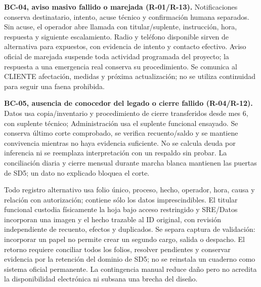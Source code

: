\textbf{BC-04, aviso masivo fallido o marejada (R-01/R-13).} Notificaciones conserva destinatario, intento, acuse técnico y confirmación humana separados. Sin acuse, el operador abre llamada con titular/suplente, instrucción, hora, respuesta y siguiente escalamiento. Radio y teléfono disponible sirven de alternativa para expuestos, con evidencia de intento y contacto efectivo. Aviso oficial de marejada suspende toda actividad programada del proyecto; la respuesta a una emergencia real conserva su procedimiento. Se comunica al CLIENTE afectación, medidas y próxima actualización; no se utiliza continuidad para seguir una faena prohibida.

\textbf{BC-05, ausencia de conocedor del legado o cierre fallido (R-04/R-12).} Datos usa copia/inventario y procedimiento de cierre transferidos desde mes 6, con suplente técnico; Administración usa el suplente funcional ensayado. Se conserva último corte comprobado, se verifica recuento/saldo y se mantiene convivencia mientras no haya evidencia suficiente. No se calcula deuda por inferencia ni se reemplaza interpretación con un respaldo sin probar. La conciliación diaria y cierre mensual durante marcha blanca mantienen las puertas de SD5; un dato no explicado bloquea el corte.

Todo registro alternativo usa folio único, proceso, hecho, operador, hora, causa y relación con autorización; contiene sólo los datos imprescindibles. El titular funcional custodia físicamente la hoja bajo acceso restringido y SRE/Datos incorporan una imagen y el hecho trazable al ID original, con revisión independiente de recuento, efectos y duplicados. Se separa captura de validación: incorporar un papel no permite crear un segundo cargo, salida o despacho. El retorno requiere conciliar todos los folios, resolver pendientes y conservar evidencia por la retención del dominio de SD5; no se reinstala un cuaderno como sistema oficial permanente. La contingencia manual reduce daño pero no acredita la disponibilidad electrónica ni subsana una brecha del diseño.
